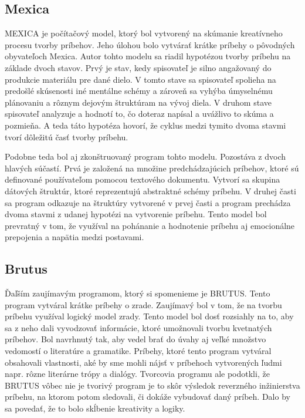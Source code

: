 \subsection{Mexica}
MEXICA\cite{mexica} je počítačový model, ktorý bol vytvorený na skúmanie kreatívneho procesu tvorby príbehov. Jeho úlohou bolo vytvárať krátke príbehy o pôvodných obyvateľoch Mexica. Autor tohto modelu sa riadil hypotézou tvorby príbehu na základe dvoch stavov. Prvý je stav, kedy spisovateľ je silno angažovaný do produkcie materiálu pre dané dielo. V tomto stave sa spisovateľ spolieha na predošlé skúsenosti iné mentálne schémy a zároveň sa vyhýba úmyselnému plánovaniu a rôznym dejovým štruktúram na vývoj diela. V druhom stave spisovateľ analyzuje a hodnotí to, čo doteraz napísal a uvážlivo to skúma a pozmieňa. A teda táto hypotéza hovorí, že cyklus medzi tymito dvoma stavmi tvorí dôležitú časť tvorby príbehu.\par
Podobne teda bol aj zkonštruovaný program tohto modelu. Pozostáva z dvoch hlavých súčastí. Prvá je založená na množine predchádzajúcich príbehov, ktoré sú definované používateľom pomocou textového dokumentu. Vytvorí sa skupina dátových štruktúr, ktoré reprezentujú abstraktné schémy príbehu. V druhej časti sa program odkazuje na štruktúry vytvorené v prvej časti a program prechádza dvoma stavmi z udanej hypotézi na vytvorenie príbehu. Tento model bol prevratný v tom, že využíval na pohánanie a hodnotenie príbehu aj emocionálne prepojenia a napätia medzi postavami.
\subsection{Brutus}
Ďaľším zaujímavým programom, ktorý si spomenieme je BRUTUS\cite{brutus}. Tento program vytváral krátke príbehy o zrade. Zaujímavý bol v tom, že na tvorbu príbehu využíval logický model zrady. Tento model bol dosť rozsiahly na to, aby sa z neho dali vyvodzovať informácie, ktoré umožnovali tvorbu kvetnatých príbehov. Bol navrhnutý tak, aby vedel brať do úvahy aj veľké množstvo vedomostí o literatúre a gramatike. Príbehy, ktoré tento program vytváral obsahovali vlastnosti, aké by sme mohli nájsť v príbehoch vytvorených ľudmi napr. rôzne literárne trópy a dialógy. Tvorcovia programu ale podotkli, že BRUTUS vôbec nie je tvorivý program je to skôr výsledok reverzného inžinierstva príbehu, na ktorom potom sledovali, či dokáže vybudovať daný príbeh. Dalo by sa povedať, že to bolo skĺbenie kreativity a logiky.
